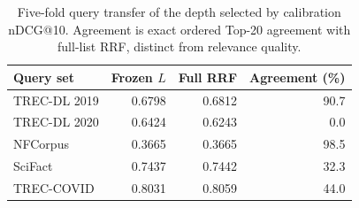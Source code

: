 \begin{table}[t]
\centering
\caption{Five-fold query transfer of the depth selected by calibration nDCG@10. Agreement is exact ordered Top-20 agreement with full-list RRF, distinct from relevance quality.}
\label{tab:transfer}
\small
\setlength{\tabcolsep}{3pt}
\begin{tabular}{lrrr}
\toprule
Query set & Frozen $L$ & Full RRF & Agreement (\%) \\
\midrule
TREC-DL 2019 & 0.6798 & 0.6812 & 90.7 \\
TREC-DL 2020 & 0.6424 & 0.6243 & 0.0 \\
NFCorpus & 0.3665 & 0.3665 & 98.5 \\
SciFact & 0.7437 & 0.7442 & 32.3 \\
TREC-COVID & 0.8031 & 0.8059 & 44.0 \\
\bottomrule
\end{tabular}
\end{table}
